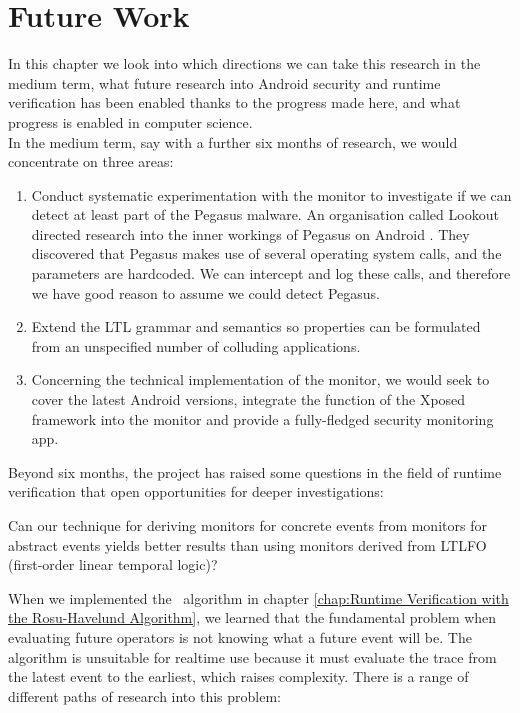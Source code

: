 \chapter{Future Work}
\label{chap:Future Work}

In this chapter we look into which directions we can take this research in the medium term, what future research into Android security and runtime verification has been enabled thanks to the progress made here, and what progress is enabled in computer science. \\

\noindent
In the medium term, say with a further six months of research, we would concentrate on three areas:

\begin{enumerate}
\item Conduct systematic experimentation with the monitor to investigate if we can detect at least part of the Pegasus malware.  An organisation called Lookout directed research into the inner workings of Pegasus on Android \cite{PegasusOnAndroid}.  They discovered that Pegasus makes use of several operating system calls, and the parameters are hardcoded.  We can intercept and log these calls, and therefore we have good reason to assume we could detect Pegasus.

\item Extend the LTL grammar and semantics so properties can be formulated from an unspecified number of colluding applications.

\item Concerning the technical implementation of the monitor, we would seek to cover the latest Android versions, integrate the function of the Xposed framework into the monitor and provide a fully-fledged security monitoring app.
\end{enumerate}

\noindent
Beyond six months, the project has raised some questions in the field of runtime verification that open opportunities for deeper investigations:

Can our technique for deriving monitors for concrete events from monitors for abstract events yields better results than using monitors derived from LTLFO (first-order linear temporal logic)?

When we implemented the \RH\ algorithm in chapter \ref{chap:Runtime Verification with the Rosu-Havelund Algorithm}, we learned that the fundamental problem when evaluating future operators is not knowing what a future event will be.  The algorithm is unsuitable for realtime use because it must evaluate the trace from the latest event to the earliest, which raises complexity.  There is a range of different paths of research into this problem:

